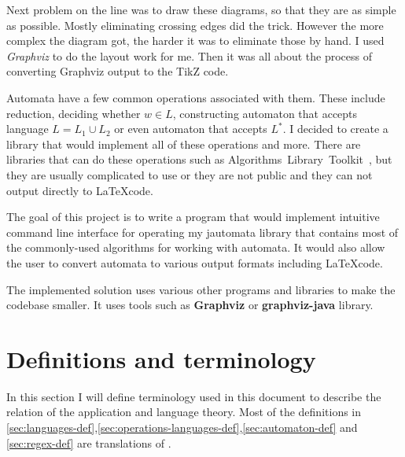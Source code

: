 \documentclass{ctuthesis}
\begin{document}
Next problem on the line was to draw these diagrams, so that they are as simple as possible. Mostly eliminating crossing edges did the trick. However the more complex the diagram got, the harder it was to eliminate those by hand. I used \textit{Graphviz} to do the layout work for me. Then it was all about the process of converting Graphviz output to the TikZ code.

Automata have a few common operations associated with them. These include reduction, deciding whether $w \in L$, constructing automaton that accepts language $L = L_1 \cup L_2$ or even automaton that accepts $L^*$. I decided to create a library that would implement all of these operations and more. There are libraries that can do these operations such as Algorithms~Library~Toolkit~\cite{alg_lib_toolkit}, but they are usually complicated to use or they are not public and they can not output directly to \LaTeX code. 

The goal of this project is to write a program that would implement intuitive command line interface for operating my jautomata library that contains most of the commonly-used algorithms for working with automata. It would also allow the user to convert automata to various output formats including \LaTeX code.

The implemented solution uses various other programs and libraries to make the codebase smaller. It uses tools such as \textbf{Graphviz} or \textbf{graphviz-java} library. 

\chapter{Definitions and terminology}
In this section I will define terminology used in this document to describe the relation of the application and language theory. Most of the definitions in \ref{sec:languages-def},\ref{sec:operations-languages-def},\ref{sec:automaton-def} and \ref{sec:regex-def} are translations of \cite{demlova}.
 
\end{document}
